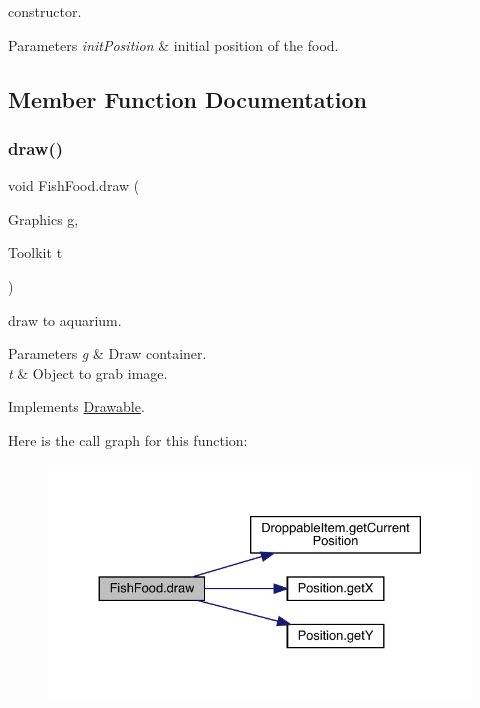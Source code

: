 constructor. 
\begin{DoxyParams}{Parameters}
{\em init\+Position} & initial position of the food. \\
\hline
\end{DoxyParams}


\subsection{Member Function Documentation}
\mbox{\label{class_fish_food_a061d353336adc633607668e8d8a73b25}} 
\subsubsection{\texorpdfstring{draw()}{draw()}}
{\footnotesize\ttfamily void Fish\+Food.\+draw (\begin{DoxyParamCaption}\item[{Graphics}]{g,  }\item[{Toolkit}]{t }\end{DoxyParamCaption})\hspace{0.3cm}{\ttfamily [inline]}}

draw to aquarium. 
\begin{DoxyParams}{Parameters}
{\em g} & Draw container. \\
\hline
{\em t} & Object to grab image. \\
\hline
\end{DoxyParams}


Implements \mbox{\hyperlink{interface_drawable_aaddafb212b3c8e60fcc742052570c893}{Drawable}}.

Here is the call graph for this function\+:
\nopagebreak
\begin{figure}[H]
\begin{center}
\leavevmode
\includegraphics[width=330pt]{class_fish_food_a061d353336adc633607668e8d8a73b25_cgraph}
\end{center}
\end{figure}


